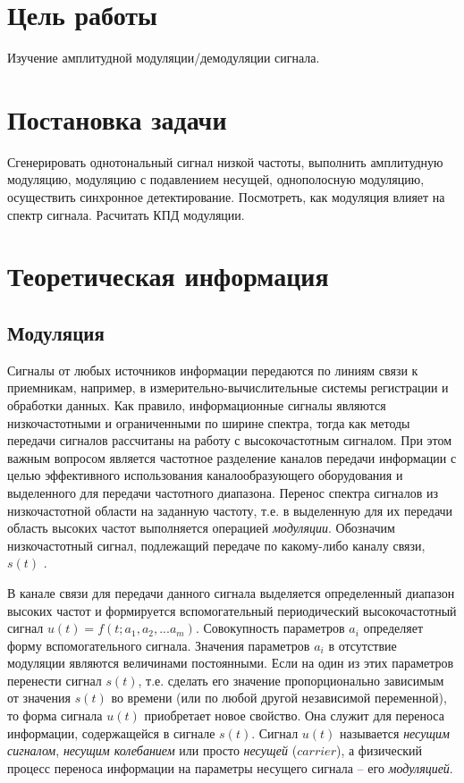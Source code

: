 

\setcounter{tocdepth}{3}







\section{Цель работы}
Изучение амплитудной модуляции/демодуляции сигнала.

\section{Постановка задачи}
Сгенерировать однотональный сигнал низкой частоты, выполнить амплитудную модуляцию, модуляцию с подавлением несущей, однополосную модуляцию, осуществить синхронное детектирование. Посмотреть, как модуляция влияет на спектр сигнала. Расчитать КПД модуляции.

\section{Теоретическая информация}

\subsection{Модуляция}
Сигналы от любых источников информации передаются по линиям связи к приемникам, например, в измерительно-вычислительные системы регистрации и обработки данных. Как правило, информационные сигналы являются низкочастотными и ограниченными по ширине спектра, тогда как методы передачи сигналов рассчитаны на работу с высокочастотным сигналом. При этом важным вопросом является частотное разделение каналов передачи информации с целью эффективного использования каналообразующего оборудования и выделенного для передачи частотного диапазона. Перенос спектра сигналов из низкочастотной области на заданную частоту, т.е. в выделенную для их передачи область высоких частот выполняется операцией \textit{модуляции}. Обозначим низкочастотный сигнал, подлежащий передаче по какому-либо каналу связи, $s(t)$ .   

В канале связи для передачи данного сигнала выделяется определенный диапазон высоких частот и формируется вспомогательный периодический высокочастотный сигнал $u(t)   =   f(t;   a_1,   a_2,   ...   a_m)$. Совокупность параметров $a_i$ определяет форму вспомогательного сигнала. Значения параметров $a_i$ в отсутствие модуляции являются величинами постоянными. Если на один из этих параметров перенести сигнал $s(t)$, т.е. сделать его значение пропорционально зависимым от значения $s(t)$ во времени (или по любой другой независимой переменной), то форма сигнала $u(t)$ приобретает новое свойство. Она служит для переноса информации, содержащейся в сигнале $s(t)$. Сигнал $u(t)$ называется \textit{несущим сигналом}, \textit{несущим колебанием} или просто \textit{несущей}  ($carrier$),  а физический процесс переноса информации на
параметры несущего сигнала     –     его \textit{модуляцией}. 

